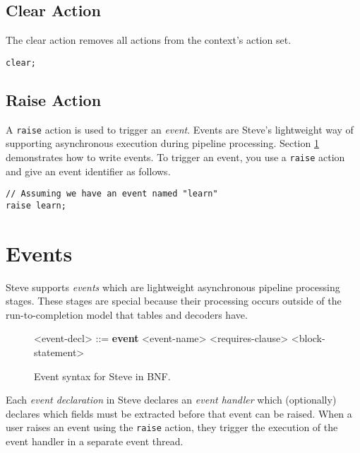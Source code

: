 \subsection{Clear Action} \label{clear_action_tut}

The clear action removes all actions from the context's action set.

\begin{lstlisting}
clear;
\end{lstlisting}

\subsection{Raise Action} \label{raise_action_tut}

A \texttt{raise} action is used to trigger an \textit{event}. Events are Steve's lightweight way of supporting asynchronous execution during pipeline processing. Section \ref{event_tut} demonstrates how to write events. To trigger an event, you use a \texttt{raise} action and give an event identifier as follows.

\begin{lstlisting}
// Assuming we have an event named "learn"
raise learn;
\end{lstlisting}

\section{Events} \label{event_tut}

Steve supports \textit{events} which are lightweight asynchronous pipeline processing stages. These stages are special because their processing occurs outside of the run-to-completion model that tables and decoders have. 

\begin{figure}[ht]
\begin{mdframed}
\begin{grammar}

<event-decl> ::=
\textbf{event} <event-name> <requires-clause> 
<block-statement>

\end{grammar}
\end{mdframed}
\caption{Event syntax for Steve in BNF.}
\label{fg:event_syntax}
\end{figure}

Each \textit{event declaration} in Steve declares an \textit{event handler} which (optionally) declares which fields must be extracted before that event can be raised. When a user raises an event using the \texttt{raise} action, they trigger the execution of the event handler in a separate event thread.

